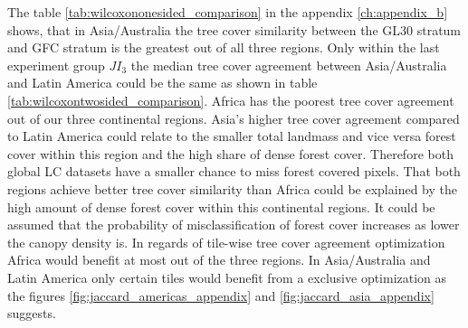 			The table \ref{tab:wilcoxononesided_comparison} in the appendix \ref{ch:appendix_b} shows, that in Asia/Australia the tree cover similarity between the \ac{GL30} stratum and \ac{GFC} stratum is the greatest out of all three regions. Only within the last experiment group $JI_3$ the median tree cover agreement between Asia/Australia and Latin America could be the same as shown in table \ref{tab:wilcoxontwosided_comparison}. Africa has the poorest tree cover agreement out of our three continental regions. Asia's higher tree cover agreement compared to Latin America could relate to the smaller total landmass and vice versa forest cover within this region and the high share of dense forest cover. Therefore both global \ac{LC} datasets have a smaller chance to miss forest covered pixels. That both regions achieve better tree cover similarity than Africa could be explained by the high amount of dense forest cover within this continental regions. It could be assumed that the probability of misclassification of forest cover increases as lower the canopy density is. In regards of tile-wise tree cover agreement optimization Africa would  benefit at most out of the three regions. In Asia/Australia and Latin America only certain tiles would benefit from a exclusive optimization as the figures \ref{fig:jaccard_americas_appendix} and \ref{fig:jaccard_asia_appendix} suggests.

